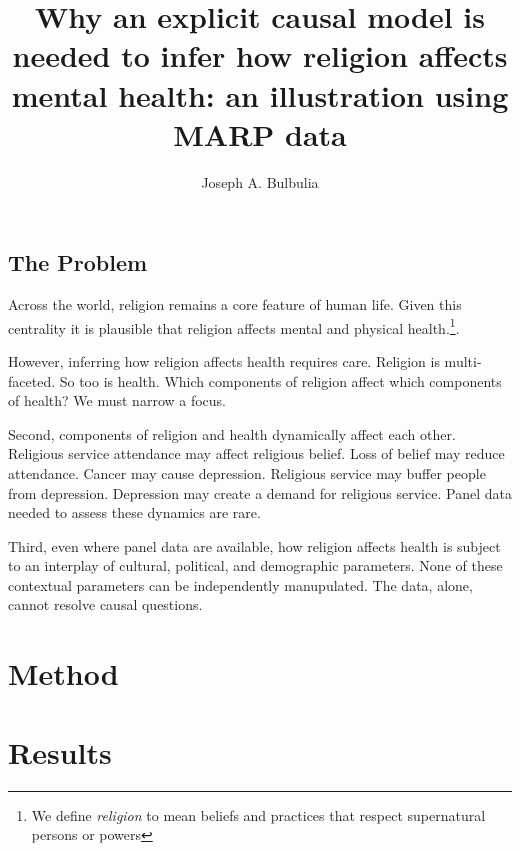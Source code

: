 \documentclass[man]{article}%
\title{Why an explicit causal model is needed to infer how religion affects mental health: an illustration using MARP data}
\author{Joseph A. Bulbulia}
\affiliation{Victoria University of Wellington, New Zealand}
\begin{document}
\maketitle

\subsection*{The Problem}

Across the world, religion remains a core feature of human life. Given this centrality it is plausible that religion affects mental and physical health.\footnote{We define {\it religion} to mean beliefs and practices that respect supernatural persons or powers}. 

However, inferring how religion affects health requires care. Religion is multi-faceted. So too is health. Which components of religion affect which components of health? We must narrow a focus. 

Second, components of religion and health dynamically affect each other. Religious service attendance may affect religious belief. Loss of belief may reduce attendance. Cancer may cause depression. Religious service may buffer people from depression. Depression may create a demand for religious service. Panel data needed to assess these dynamics are rare.

Third, even where panel data are available, how religion affects health is subject to an interplay of cultural, political, and demographic parameters. None of these contextual parameters can be independently manupulated. The data, alone, cannot resolve causal questions.

\subsection*{}





\section{Method}


\section{Results}
\end{document}
